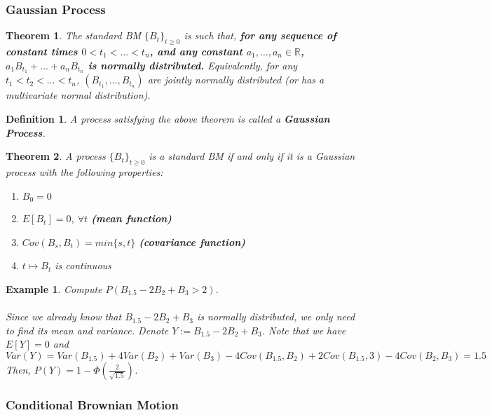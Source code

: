 \documentclass[12pt]{article}
\newtheorem{definition}{Definition}
\newtheorem{theorem}{Theorem}
\newtheorem{example}{Example}
\begin{document}
\subsubsection{Gaussian Process}

\begin{theorem}
    The standard BM $\{B_t\}_{t\geq 0}$ is such that, \textbf{for any sequence of constant times $0 < t_1 < \dots < t_n$, and any constant $a_1, \dots, a_n \in \mathbb{R}$, $a_1B_{t_1}+\dots +a_nB_{t_n}$ is normally distributed.}
    Equivalently, for any $t_1 < t_2 < \dots < t_n$, $(B_{t_1}, \dots, B_{t_n})$ are jointly normally distributed (or has a multivariate normal distribution).
\end{theorem}

\begin{definition}
    A process satisfying the above theorem is called a \textbf{Gaussian Process}.
\end{definition}

\begin{theorem}
    A process $\{B_t\}_{t\geq 0}$ is a standard BM if and only if it is a Gaussian process with the following properties:
    \begin{enumerate}
        \item $B_0 = 0$
        \item $E[B_t]=0$, $\forall t$ \textbf{(mean function)}
        \item $Cov(B_s,B_t)=min\{s,t\}$ \textbf{(covariance function)}
        \item $t \mapsto B_t$ is continuous
    \end{enumerate}
\end{theorem}

\begin{example}
    Compute $P(B_{1.5}-2B_2+B_3 > 2)$.
    \\
    \\
    Since we already know that $B_{1.5}-2B_2+B_3$ is normally distributed, we only need to find its mean and variance. Denote $Y := B_{1.5}-2B_2+B_3$. Note that we have $E[Y] = 0$ and $Var(Y) = Var(B_{1.5}) + 4Var(B_2) + Var(B_3) - 4Cov(B_{1.5},B_2) + 2Cov(B_{1.5},3) - 4Cov(B_2,B_3) = 1.5$ Then, $P(Y) = 1 - \Phi(\frac{2}{\sqrt{1.5}})$.
\end{example}

\subsubsection{Conditional Brownian Motion}
\end{document}
